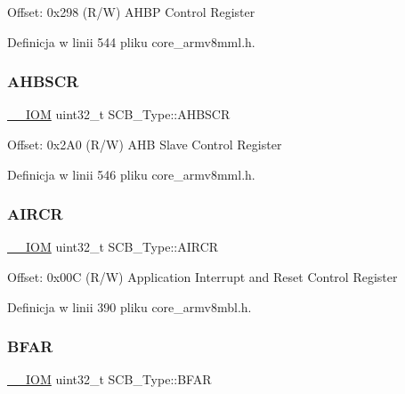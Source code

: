 Offset\+: 0x298 (R/W) A\+H\+BP Control Register 

Definicja w linii 544 pliku core\+\_\+armv8mml.\+h.

\mbox{\label{struct_s_c_b___type_a8c9d9eac30594dd061d34cfaacd5e4bb}} 
\subsubsection{\texorpdfstring{A\+H\+B\+S\+CR}{AHBSCR}}
{\footnotesize\ttfamily \hyperlink{core__sc300_8h_ab6caba5853a60a17e8e04499b52bf691}{\+\_\+\+\_\+\+I\+OM} uint32\+\_\+t S\+C\+B\+\_\+\+Type\+::\+A\+H\+B\+S\+CR}

Offset\+: 0x2\+A0 (R/W) A\+HB Slave Control Register 

Definicja w linii 546 pliku core\+\_\+armv8mml.\+h.

\mbox{\label{struct_s_c_b___type_ad3e5b8934c647eb1b7383c1894f01380}} 
\subsubsection{\texorpdfstring{A\+I\+R\+CR}{AIRCR}}
{\footnotesize\ttfamily \hyperlink{core__sc300_8h_ab6caba5853a60a17e8e04499b52bf691}{\+\_\+\+\_\+\+I\+OM} uint32\+\_\+t S\+C\+B\+\_\+\+Type\+::\+A\+I\+R\+CR}

Offset\+: 0x00C (R/W) Application Interrupt and Reset Control Register 

Definicja w linii 390 pliku core\+\_\+armv8mbl.\+h.

\mbox{\label{struct_s_c_b___type_a3f8e7e58be4e41c88dfa78f54589271c}} 
\subsubsection{\texorpdfstring{B\+F\+AR}{BFAR}}
{\footnotesize\ttfamily \hyperlink{core__sc300_8h_ab6caba5853a60a17e8e04499b52bf691}{\+\_\+\+\_\+\+I\+OM} uint32\+\_\+t S\+C\+B\+\_\+\+Type\+::\+B\+F\+AR}

